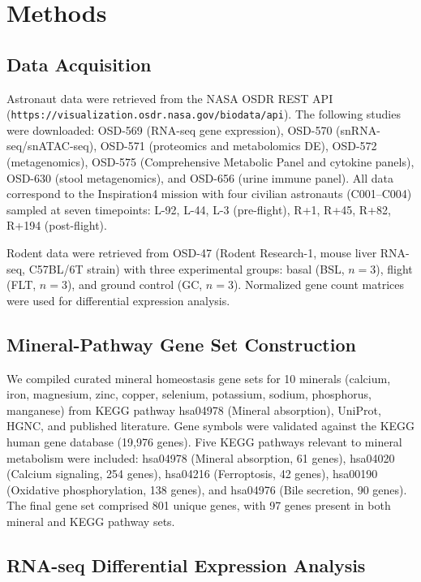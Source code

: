 \documentclass[11pt,a4paper]{article}
\begin{document}
\section{Methods}

\subsection{Data Acquisition}

Astronaut data were retrieved from the NASA OSDR REST API (\texttt{https://visualization.osdr.nasa.gov/biodata/api}). The following studies were downloaded: OSD-569 (RNA-seq gene expression), OSD-570 (snRNA-seq/snATAC-seq), OSD-571 (proteomics and metabolomics DE), OSD-572 (metagenomics), OSD-575 (Comprehensive Metabolic Panel and cytokine panels), OSD-630 (stool metagenomics), and OSD-656 (urine immune panel). All data correspond to the Inspiration4 mission with four civilian astronauts (C001--C004) sampled at seven timepoints: L-92, L-44, L-3 (pre-flight), R+1, R+45, R+82, R+194 (post-flight).

Rodent data were retrieved from OSD-47 (Rodent Research-1, mouse liver RNA-seq, C57BL/6T strain) with three experimental groups: basal (BSL, $n=3$), flight (FLT, $n=3$), and ground control (GC, $n=3$). Normalized gene count matrices were used for differential expression analysis.

\subsection{Mineral-Pathway Gene Set Construction}

We compiled curated mineral homeostasis gene sets for 10 minerals (calcium, iron, magnesium, zinc, copper, selenium, potassium, sodium, phosphorus, manganese) from KEGG pathway hsa04978 (Mineral absorption), UniProt, HGNC, and published literature. Gene symbols were validated against the KEGG human gene database (19,976 genes). Five KEGG pathways relevant to mineral metabolism were included: hsa04978 (Mineral absorption, 61 genes), hsa04020 (Calcium signaling, 254 genes), hsa04216 (Ferroptosis, 42 genes), hsa00190 (Oxidative phosphorylation, 138 genes), and hsa04976 (Bile secretion, 90 genes). The final gene set comprised 801 unique genes, with 97 genes present in both mineral and KEGG pathway sets.

\subsection{RNA-seq Differential Expression Analysis}
\end{document}
